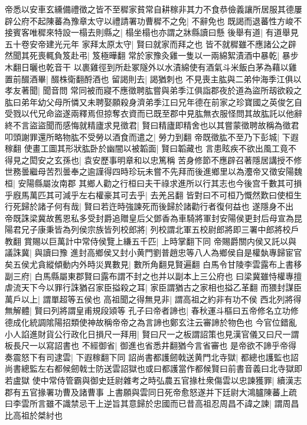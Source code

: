 帝悉以安車玄纁備禮徵之皆不至穉家貧常自耕稼非其力不食恭儉義讓所居服其德屢辟公府不起陳蕃為豫章太守以禮請署功曹穉不之免|{
	不辭免也}
既謁而退蕃性方峻不接賓客唯穉來特設一榻去則縣之|{
	榻坐榻也亦謂之牀縣讀曰懸}
後舉有道|{
	有道舉見五十卷安帝建光元年}
家拜太原太守|{
	賢曰就家而拜之也}
皆不就穉雖不應諸公之辟然聞其死喪輒負笈赴弔|{
	笈極曄翻}
常於家豫灸雞一隻以一兩綿絮漬酒中暴乾|{
	暴步木翻日曬也乾音干}
以裹雞徑到所赴冢隧外以水漬綿使有酒氣斗米飯白茅為藉以雞置前醊酒畢|{
	醊株衛翻酹酒也}
留謁則去|{
	謁猶刺也}
不見喪主肱與二弟仲海季江俱以孝友著聞|{
	聞音問}
常同被而寢不應徵聘肱嘗與弟季江俱詣郡夜於道為盜所刼欲殺之肱曰弟年幼父母所憐又未聘娶願殺身濟弟季江曰兄年德在前家之珍寶國之英俊乞自受戮以代兄命盜遂兩釋焉但掠奪衣資而已既至郡中見肱無衣服怪問其故肱託以他辭終不言盜盜聞而感悔就精廬求見徵君|{
	賢曰精廬即精舍也以其嘗蒙徵聘故稱為徵君}
叩頭謝罪還所略物肱不受勞以酒食而遣之|{
	勞力到翻}
帝既徵肱不至乃下彭城|{
	下遐稼翻}
使畫工圖其形狀肱卧於幽闇以被韜面|{
	賢曰韜藏也}
言患眩疾不欲出風工竟不得見之閎安之玄孫也|{
	袁安歷事明章和以忠篤稱}
苦身修節不應辟召著隱居講授不修世務曇繼母苦烈曇奉之逾謹得四時珍玩未嘗不先拜而後進鄉里以為灋帝又徵安陽魏桓|{
	安陽縣屬汝南郡}
其鄉人勸之行桓曰夫干祿求進所以行其志也今後宫千數其可損乎廐馬萬匹其可減乎左右權豪其可去乎|{
	去羌呂翻}
皆對曰不可桓乃慨然歎曰使桓生行死歸於諸子何有哉|{
	賢曰若迕時強諫死而後歸於諸勸行者復何益也}
遂隱身不出　帝既誅梁冀故舊恩私多受封爵追贈皇后父鄧香為車騎將軍封安陽侯更封后母宣為昆陽君兄子康秉皆為列侯宗族皆列校郎將|{
	列校謂北軍五校尉郎將即三署中郎將校戶教翻}
賞賜以巨萬計中常侍侯覽上縑五千匹|{
	上時掌翻下同}
帝賜爵關内侯又託以與議誅冀|{
	與讀曰豫}
進封高鄉侯又封小黄門劉普趙忠等八人為鄉侯自是權埶專歸宦官矣五侯尤貪縱傾動内外時災異數見|{
	數所角翻見賢遍翻}
白馬令甘陵李雲露布上書移副三府|{
	白馬縣屬東郡賢曰露布謂不封之也并以副本上三公府也}
曰梁冀雖恃權專擅虐流天下今以罪行誅猶召家臣搤殺之耳|{
	家臣謂猶古之家相也搤乙革翻}
而猥封謀臣萬戶以上|{
	謂單超等五侯也}
高祖聞之得無見非|{
	謂高祖之約非有功不侯}
西北列將得無解體|{
	賢曰列將謂皇甫規段熲等}
孔子曰帝者諦也|{
	春秋運斗樞曰五帝修名立功修德成化統調隂陽招類使神故稱帝帝之為言諦也鄭玄注云審諦於物色也}
今官位錯亂小人諂進財貨公行政化日損尺一拜用|{
	賢曰尺一之板謂詔策也見漢官儀又曰尺一謂板長尺一以寫詔書也}
不經御省|{
	御進也省悉井翻猶今言省審也}
是帝欲不諦乎帝得奏震怒下有司逮雲|{
	下遐稼翻下同}
詔尚書都護劒戟送黄門北寺獄|{
	都總也護監也詔尚書總監左右都候劒戟士防送雲詔獄也或曰都護當作都候賢曰前書音義曰北寺獄即若盧獄}
使中常侍管霸與御史廷尉雜考之時弘農五官掾杜衆傷雲以忠諫獲罪|{
	續漢志郡有五官掾署功曹及諸曹事}
上書願與雲同日死帝愈怒遂并下廷尉大鴻臚陳蕃上疏曰李雲所言雖不識禁忌干上逆旨其意歸於忠國而已昔高祖忍周昌不諱之諫|{
	謂周昌比高祖於桀紂也}
